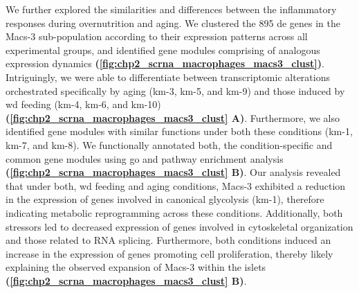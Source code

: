 \par We further explored the similarities and differences between the inflammatory responses during overnutrition and aging. We clustered the 895 \gls{de} genes in the Macs-3 sub-population according to their expression patterns across all experimental groups, and identified gene modules comprising of analogous expression dynamics \textbf{(\autoref{fig:chp2_scrna_macrophages_macs3_clust})}. Intriguingly, we were able to differentiate between transcriptomic alterations orchestrated specifically by aging (km-3, km-5, and km-9) and those induced by \gls{wd} feeding (km-4, km-6, and km-10) \textbf{(\autoref{fig:chp2_scrna_macrophages_macs3_clust} A)}. Furthermore, we also identified gene modules with similar functions under both these conditions (km-1, km-7, and km-8). We functionally annotated both, the condition-specific and common gene modules using \gls{go} and pathway enrichment analysis \textbf{(\autoref{fig:chp2_scrna_macrophages_macs3_clust} B)}. Our analysis revealed that under both, \gls{wd} feeding and aging conditions, Macs-3 exhibited a reduction in the expression of genes involved in canonical glycolysis (km-1), therefore indicating metabolic reprogramming across these conditions. Additionally, both stressors led to decreased expression of genes involved in cytoskeletal organization and those related to RNA splicing. Furthermore, both conditions induced an increase in the expression of genes promoting cell proliferation, thereby likely explaining the observed expansion of Macs-3 within the islets \textbf{(\autoref{fig:chp2_scrna_macrophages_macs3_clust} B)}.\\


